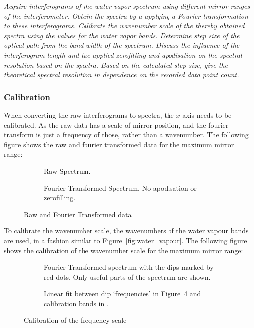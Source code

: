 \documentclass{article}
\begin{document}
\textit{Acquire interferograms of the water vapor spectrum using different mirror ranges of the
interferometer. Obtain the spectra by a applying a Fourier transformation to these interferograms.
Calibrate the wavenumber scale of the thereby obtained spectra using the values for the water
vapor bands. Determine step size of the optical path from the band width of the spectrum.
Discuss the influence of the interferogram length and the applied zerofilling and apodisation on
the spectral resolution based on the spectra. Based on the calculated step size, give the
theoretical spectral resolution in dependence on the recorded data point count.}

\subsubsection{Calibration}

When converting the raw interferograms to spectra, the $x$-axis needs to be calibrated. As the raw data has a scale of mirror position, and the fourier transform is just a frequency of those, rather than a wavenumber. The following figure shows the raw and fourier transformed data for the maximum mirror range:

\begin{figure}[h!]
	\centering
	\begin{subfigure}[t]{0.48\textwidth}
		\centering
		\scalebox{0.5}{}
		\caption{Raw Spectrum.}
		\label{fig:air32000mirrored}
	\end{subfigure} \hfill
	\begin{subfigure}[t]{0.48\textwidth}
		\centering
		\scalebox{0.5}{}
		\caption{Fourier Transformed Spectrum. No apodisation or zerofilling.}
		\label{fig:air32000fourier}
	\end{subfigure}
	\caption{Raw and Fourier Transformed data}
	\label{fig:air32000}
\end{figure}

To calibrate the wavenumber scale, the wavenumbers of the water vapour bands are used, in a fashion similar to Figure~\ref{fig:water_vapour}. The following figure shows the calibration of the wavenumber scale for the maximum mirror range:

\begin{figure}[h!]
	\centering
	\begin{subfigure}[t]{0.48\textwidth}
		\centering
		\scalebox{0.5}{}
		\caption{Fourier Transformed spectrum with the dips marked by red dots. Only useful parts of the spectrum are shown.}
		\label{fig:air32000dips}
	\end{subfigure} \hfill
	\begin{subfigure}[t]{0.48\textwidth}
		\centering
		\scalebox{0.5}{}
		\caption{Linear fit between dip `frequencies' in Figure~\ref{fig:air32000dips} and calibration bands in \cite{riede_rotationvibration}.}
		\label{fig:linearfit_calibration}
	\end{subfigure}
	\caption{Calibration of the frequency scale}
	\label{fig:calibration}
\end{figure}
\end{document}
